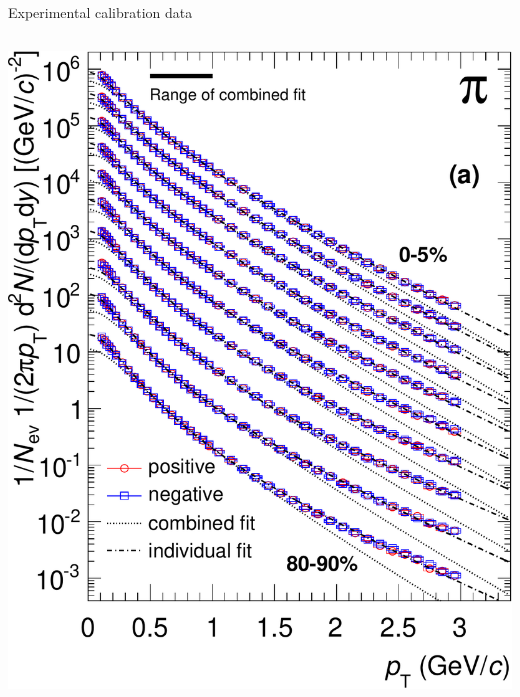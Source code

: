 \documentclass{beamer}
\begin{document}
\begin{frame}{Experimental calibration data}
\begin{columns}
    \includegraphics[height=.25\textheight]{spectra} \\

\end{columns}
\end{frame}
\end{document}
